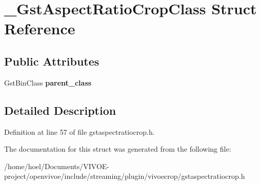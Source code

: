 \hypertarget{struct__GstAspectRatioCropClass}{}\section{\+\_\+\+Gst\+Aspect\+Ratio\+Crop\+Class Struct Reference}
\label{struct__GstAspectRatioCropClass}
\subsection*{Public Attributes}
\begin{DoxyCompactItemize}
\item 
Gst\+Bin\+Class {\bfseries parent\+\_\+class}\hypertarget{struct__GstAspectRatioCropClass_aaec678f46147e2c6ef19e6474d33df59}{}\label{struct__GstAspectRatioCropClass_aaec678f46147e2c6ef19e6474d33df59}

\end{DoxyCompactItemize}


\subsection{Detailed Description}


Definition at line 57 of file gstaspectratiocrop.\+h.



The documentation for this struct was generated from the following file\+:\begin{DoxyCompactItemize}
\item 
/home/hoel/\+Documents/\+V\+I\+V\+O\+E-\/project/openvivoe/include/streaming/plugin/vivoecrop/gstaspectratiocrop.\+h\end{DoxyCompactItemize}
